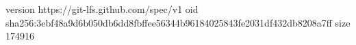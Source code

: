 version https://git-lfs.github.com/spec/v1
oid sha256:3ebf48a9d6b050db6dd8fbffee56344b96184025843fe2031df432db8208a7ff
size 174916
